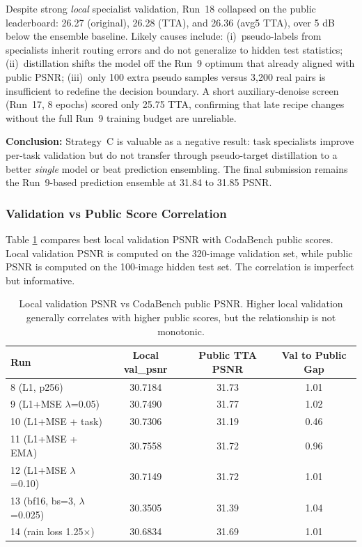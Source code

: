 \documentclass[12pt, a4paper]{article}
\begin{document}
Despite strong \emph{local} specialist validation, Run~18 collapsed on the public leaderboard: 26.27 (original), 26.28 (TTA), and 26.36 (avg5 TTA), over 5 dB below the ensemble baseline. Likely causes include: (i)~pseudo-labels from specialists inherit routing errors and do not generalize to hidden test statistics; (ii)~distillation shifts the model off the Run~9 optimum that already aligned with public PSNR; (iii)~only 100 extra pseudo samples versus 3,200 real pairs is insufficient to redefine the decision boundary. A short auxiliary-denoise screen (Run~17, 8 epochs) scored only 25.75 TTA, confirming that late recipe changes without the full Run~9 training budget are unreliable.

\textbf{Conclusion:} Strategy~C is valuable as a negative result: task specialists improve per-task validation but do not transfer through pseudo-target distillation to a better \emph{single} model or beat prediction ensembling. The final submission remains the Run~9-based prediction ensemble at 31.84 to 31.85 PSNR.

\subsubsection{Validation vs Public Score Correlation}
Table \ref{tab:val_vs_public} compares best local validation PSNR with CodaBench public scores. Local validation PSNR is computed on the 320-image validation set, while public PSNR is computed on the 100-image hidden test set. The correlation is imperfect but informative.

\begin{table}[htbp]
\centering
\caption{Local validation PSNR vs CodaBench public PSNR. Higher local validation generally correlates with higher public scores, but the relationship is not monotonic.}
\label{tab:val_vs_public}
\small
\begin{tabular}{@{}lccc@{}}
\toprule
\textbf{Run} & \textbf{Local val\_psnr} & \textbf{Public TTA PSNR} & \textbf{Val to Public Gap} \\ \midrule
8  (L1, p256)     & 30.7184 & 31.73 & 1.01 \\
9  (L1+MSE $\lambda$=0.05) & 30.7490 & 31.77 & 1.02 \\
10 (L1+MSE + task)          & 30.7306 & 31.19 & 0.46 \\
11 (L1+MSE + EMA)           & 30.7558 & 31.72 & 0.96 \\
12 (L1+MSE $\lambda$=0.10)   & 30.7149 & 31.72 & 1.01 \\
13 (bf16, bs=3, $\lambda$=0.025) & 30.3505 & 31.39 & 1.04 \\
14 (rain loss 1.25$\times$)    & 30.6834 & 31.69 & 1.01 \\ \bottomrule
\end{tabular}
\end{table}
\end{document}
